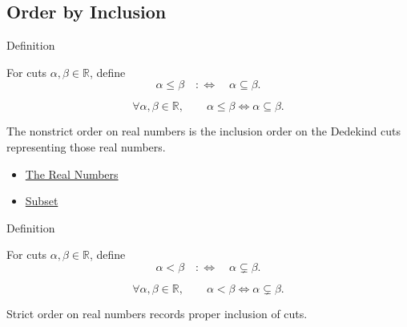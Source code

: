 \subsection*{Order by Inclusion}

\begin{definitionbox}{Definition}
\begin{definition}
\label{def:order-on-r}
For cuts $\alpha,\beta\in\mathbb{R}$, define
\[
\alpha\le\beta \quad:\Longleftrightarrow\quad \alpha\subseteq\beta.
\]
\end{definition}
\end{definitionbox}

\begin{remark*}
\[
\forall \alpha,\beta\in\mathbb{R},\qquad
\alpha\le\beta \Longleftrightarrow \alpha\subseteq\beta.
\]
\end{remark*}

\begin{remark*}[Interpretation]
The nonstrict order on real numbers is the inclusion order on the Dedekind cuts representing those real numbers.
\end{remark*}

\begin{dependencies}
\begin{itemize}
  \item \hyperref[def:reals]{The Real Numbers}
  \item \hyperref[def:subset]{Subset}
\end{itemize}
\end{dependencies}

\begin{definitionbox}{Definition}
\begin{definition}
\label{def:strict-order-on-r}
For cuts $\alpha,\beta\in\mathbb{R}$, define
\[
\alpha<\beta \quad:\Longleftrightarrow\quad \alpha\subsetneq\beta.
\]
\end{definition}
\end{definitionbox}

\begin{remark*}
\[
\forall \alpha,\beta\in\mathbb{R},\qquad
\alpha<\beta \Longleftrightarrow \alpha\subsetneq\beta.
\]
\end{remark*}

\begin{remark*}[Interpretation]
Strict order on real numbers records proper inclusion of cuts.
\end{remark*}

